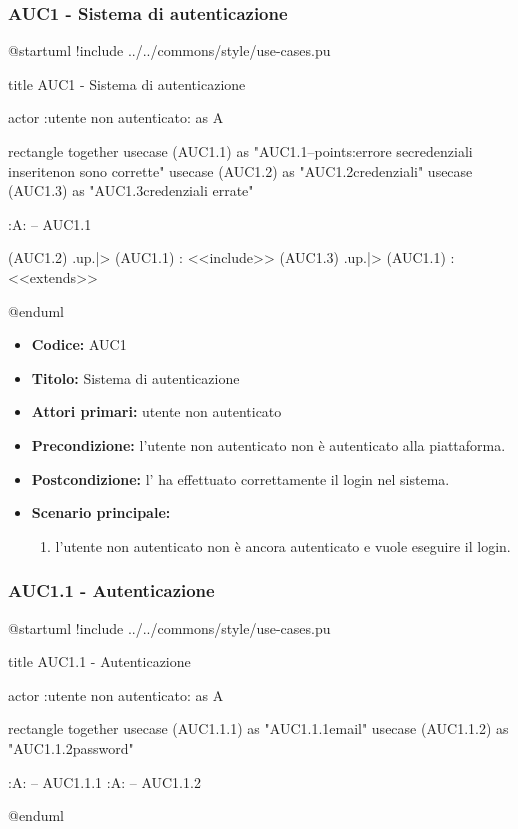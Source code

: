 \documentclass[casi-duso]{subfiles}
\begin{document}
\subsubsection{AUC1 - Sistema di autenticazione}%
\label{subsub:AUC1}

\begin{plantuml}
@startuml
!include ../../commons/style/use-cases.pu

title AUC1 - Sistema di autenticazione

actor :utente non autenticato: as A

rectangle {
  together {
    usecase (AUC1.1) as "AUC1.1\nAutenticazione\n--\nExtension points:\nVisualizzazione errore se\nle credenziali inserite\n non sono corrette"
    usecase (AUC1.2) as "AUC1.2\nVerifica credenziali"
    usecase (AUC1.3) as "AUC1.3\nVisualizzazione credenziali errate"
  }
}

:A: -- AUC1.1

(AUC1.2) .up.|> (AUC1.1) : <<include>>
(AUC1.3) .up.|> (AUC1.1) : <<extends>>

@enduml
\end{plantuml}

\begin{itemize}
  \item \textbf{Codice:} AUC1
  \item \textbf{Titolo:} Sistema di autenticazione
  \item \textbf{Attori primari:} utente non autenticato
  \item \textbf{Precondizione:} l'utente non autenticato non è autenticato alla piattaforma.
  \item \textbf{Postcondizione:} l' ha effettuato correttamente il login nel sistema.
  \item \textbf{Scenario principale:}
  \begin{enumerate}
    \item l'utente non autenticato non è ancora autenticato e vuole eseguire il login.
  \end{enumerate}
\end{itemize}

\subsubsection{AUC1.1 - Autenticazione}%
\label{subsub:AUC1.1}

\begin{plantuml}
@startuml
!include ../../commons/style/use-cases.pu

title AUC1.1 - Autenticazione

actor :utente non autenticato: as A

rectangle {
  together {
  usecase (AUC1.1.1) as "AUC1.1.1\nInserimento email"
  usecase (AUC1.1.2) as "AUC1.1.2\nInserimento password"
  }
}

:A: -- AUC1.1.1
:A: -- AUC1.1.2

@enduml
\end{plantuml}
\end{document}
